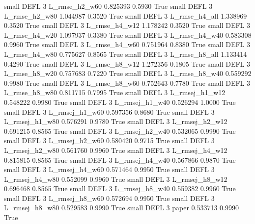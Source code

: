      small     DEFL                 3  L_rmse_h2_w60   0.825393      0.5930    True
     small     DEFL                 3  L_rmse_h2_w80   1.044987      0.3520    True
     small     DEFL                 3  L_rmse_h4_all   1.338969      0.3520    True
     small     DEFL                 3  L_rmse_h4_w12   1.178242      0.3520    True
     small     DEFL                 3  L_rmse_h4_w20   1.097937      0.3380    True
     small     DEFL                 3  L_rmse_h4_w40   0.583308      0.9960    True
     small     DEFL                 3  L_rmse_h4_w60   0.751964      0.8380    True
     small     DEFL                 3  L_rmse_h4_w80   0.775627      0.8565    True
     small     DEFL                 3  L_rmse_h8_all   1.133414      0.4290    True
     small     DEFL                 3  L_rmse_h8_w12   1.272356      0.1805    True
     small     DEFL                 3  L_rmse_h8_w20   0.757683      0.7220    True
     small     DEFL                 3  L_rmse_h8_w40   0.559292      0.9980    True
     small     DEFL                 3  L_rmse_h8_w60   0.752643      0.7780    True
     small     DEFL                 3  L_rmse_h8_w80   0.811715      0.7995    True
     small     DEFL                 3 L_rmsej_h1_w12   0.548222      0.9980    True
     small     DEFL                 3 L_rmsej_h1_w40   0.526294      1.0000    True
     small     DEFL                 3 L_rmsej_h1_w60   0.597356      0.8680    True
     small     DEFL                 3 L_rmsej_h1_w80   0.576291      0.9780    True
     small     DEFL                 3 L_rmsej_h2_w12   0.691215      0.8565    True
     small     DEFL                 3 L_rmsej_h2_w40   0.532065      0.9990    True
     small     DEFL                 3 L_rmsej_h2_w60   0.580420      0.9715    True
     small     DEFL                 3 L_rmsej_h2_w80   0.561760      0.9960    True
     small     DEFL                 3 L_rmsej_h4_w12   0.815815      0.8565    True
     small     DEFL                 3 L_rmsej_h4_w40   0.567866      0.9870    True
     small     DEFL                 3 L_rmsej_h4_w60   0.571464      0.9950    True
     small     DEFL                 3 L_rmsej_h4_w80   0.552099      0.9960    True
     small     DEFL                 3 L_rmsej_h8_w12   0.696468      0.8565    True
     small     DEFL                 3 L_rmsej_h8_w40   0.559382      0.9960    True
     small     DEFL                 3 L_rmsej_h8_w60   0.572694      0.9950    True
     small     DEFL                 3 L_rmsej_h8_w80   0.529583      0.9990    True
     small     DEFL                 3          paper   0.533713      0.9990    True
